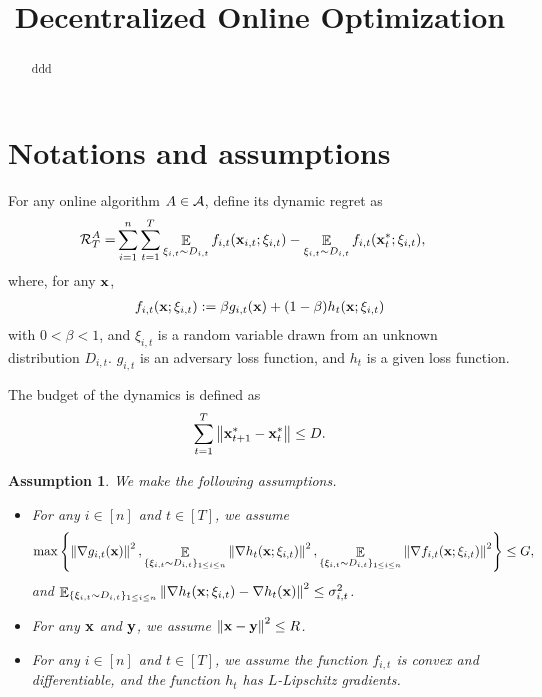 \documentclass{article}
\title{Decentralized Online Optimization}
\newtheorem{Assumption}{\bf{Assumption}}
\begin{document}
\maketitle

\begin{abstract}
ddd
\end{abstract}

\section{Notations and assumptions}





For any online algorithm $A \in {\mathcal{A}}$, define its dynamic regret as
\begin{align}
\nonumber
{\mathcal{R}}_T^{A} = & \sum_{i=1}^n\sum_{t=1}^T \mathop{\mathbb{E}}_{\xi_{i,t} \sim D_{i,t}}f_{i,t}({\bf x}_{i,t};\xi_{i,t}) - \mathop{\mathbb{E}}_{\xi_{i,t} \sim D_{i,t} }f_{i,t}({\bf x}_t^\ast;\xi_{i,t}),
\end{align} where, for any ${\bf x}$,
\begin{align}
\nonumber
f_{i,t}({\bf x};\xi_{i,t}) := \beta g_{i,t}({\bf x}) + (1-\beta) h_{t}({\bf x}; \xi_{i,t})
\end{align} with $0<\beta<1$, and $\xi_{i,t}$ is a random variable drawn from an unknown distribution $D_{i,t}$. $g_{i,t}$ is an adversary loss function, and $h_t$ is a given loss function.



The budget of the dynamics is defined as
\begin{align}
\nonumber
\sum_{t=1}^T \left\lVert{\bf x}_{t+1}^\ast - {\bf x}_t^\ast\right\rVert \le D.
\end{align}



\begin{Assumption}
\label{assumption_bounded_gradient_domain}
We make the following assumptions.
\begin{itemize}
\item For any $i\in[n]$ and $t\in[T]$, we assume
\begin{align}
\nonumber
\max\left\{\left\lVert\nabla g_{i,t}({\bf x})\right\rVert^2, \mathop{\mathbb{E}}_{ \{\xi_{i,t} \sim D_{i,t}\}_{1\le i \le n} }\left\lVert\nabla h_t({\bf x};\xi_{i,t})\right\rVert^2, \mathop{\mathbb{E}}_{ \{\xi_{i,t} \sim D_{i,t}\}_{1\le i \le n} }\left\lVert\nabla f_{i,t}({\bf x}; \xi_{i,t})\right\rVert^2 \right\} \le G,
\end{align} and $\mathop{\mathbb{E}}_{ \{\xi_{i,t} \sim D_{i,t}\}_{1\le i \le n} } \left\lVert\nabla h_t({\bf x}; \xi_{i,t}) - \nabla h_t({\bf x})\right\rVert^2 \le \sigma_{i,t}^2$.
\item For any ${\bf x}$ and ${\bf y}$, we assume $\left\lVert{\bf x}-{\bf y}\right\rVert^2 \le R$.
\item For any $i\in[n]$ and $t\in[T]$, we assume the function $f_{i,t}$ is convex and differentiable, and the function $h_t$ has  $L$-Lipschitz gradients.
\end{itemize}

 
\end{Assumption}
\end{document}
